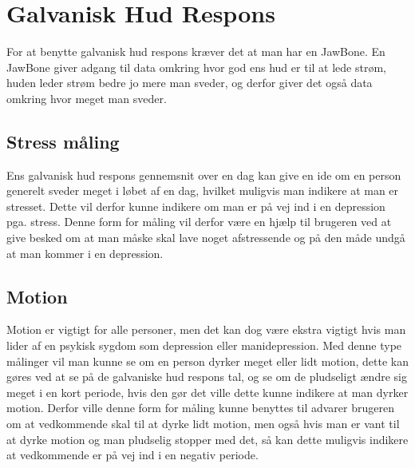 \section{Galvanisk Hud Respons}
For at benytte galvanisk hud respons kræver det at man har en JawBone.
En JawBone giver adgang til data omkring hvor god ens hud er til at lede strøm, huden leder strøm bedre jo mere man sveder, og derfor giver det også data omkring hvor meget man sveder.


\subsection{Stress måling}
Ens galvanisk hud respons gennemsnit over en dag kan give en ide om en person generelt sveder meget i løbet af en dag, hvilket muligvis man indikere at man er stresset.
Dette vil derfor kunne indikere om man er på vej ind i en depression pga. stress.
Denne form for måling vil derfor være en hjælp til brugeren ved at give besked om at man måske skal lave noget afstressende og på den måde undgå at man kommer i en depression.

\subsection{Motion}
Motion er vigtigt for alle personer, men det kan dog være ekstra vigtigt hvis man lider af en psykisk sygdom som depression eller manidepression.
Med denne type målinger vil man kunne se om en person dyrker meget eller lidt motion, dette kan gøres ved at se på de galvaniske hud respons tal, og se om de pludseligt ændre sig meget i en kort periode, hvis den gør det ville dette kunne indikere at man dyrker motion.
Derfor ville denne form for måling kunne benyttes til advarer brugeren om at vedkommende skal til at dyrke lidt motion, men også hvis man er vant til at dyrke motion og man pludselig stopper med det, så kan dette muligvis indikere at vedkommende er på vej ind i en negativ periode.

